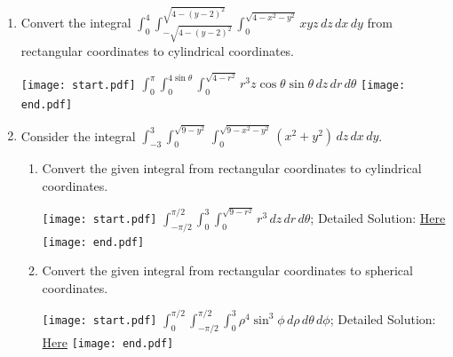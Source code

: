 \documentclass[12pt]{article}
\begin{document}
\begin{enumerate}
\item Convert the integral $\int_0^4 \int_{-\sqrt{4-(y-2)^2}}^{\sqrt{4-(y-2)^2}} \int_0^{\sqrt{4-x^2-y^2}} xyz \,dz\,dx\,dy$ from rectangular coordinates to cylindrical coordinates.

\texttt{[image: start.pdf]}
{{$\int_0^\pi \int_0^{4\sin{\theta}} \int_0^{\sqrt{4-r^2}} r^3z\cos{\theta}\sin{\theta} \,dz\,dr\,d\theta$}}
\texttt{[image: end.pdf]}


\item Consider the integral $\int_{-3}^3 \int_0^{\sqrt{9-y^2}} \int_0^{\sqrt{9-x^2-y^2}} (x^2+y^2) \,dz\,dx\,dy$.

\begin{enumerate}

\item Convert the given integral from rectangular coordinates to cylindrical coordinates.

\texttt{[image: start.pdf]}
{{$\int_{-\pi/2}^{\pi/2} \int_0^3 \int_0^{\sqrt{9-r^2}} r^3 \,dz\,dr\,d\theta$; Detailed Solution: \textcolor{blue}{\href{http://www.math.drexel.edu/classes/Calculus/resources/Math200HW/Solutions/20_200_Triple_Integrals_11.pdf}{Here}}}}
\texttt{[image: end.pdf]}


\item Convert the given integral from rectangular coordinates to spherical coordinates.

\texttt{[image: start.pdf]}
{{$\int_0^{\pi/2} \int_{-\pi/2}^{\pi/2} \int_0^3 \rho^4\sin^3{\phi}\,d\rho\,d\theta\,d\phi$; Detailed Solution: \textcolor{blue}{\href{http://www.math.drexel.edu/classes/Calculus/resources/Math200HW/Solutions/20_200_Triple_Integrals_11.pdf}{Here}}}}
\texttt{[image: end.pdf]}


\end{enumerate}

\end{enumerate}
\end{document}
